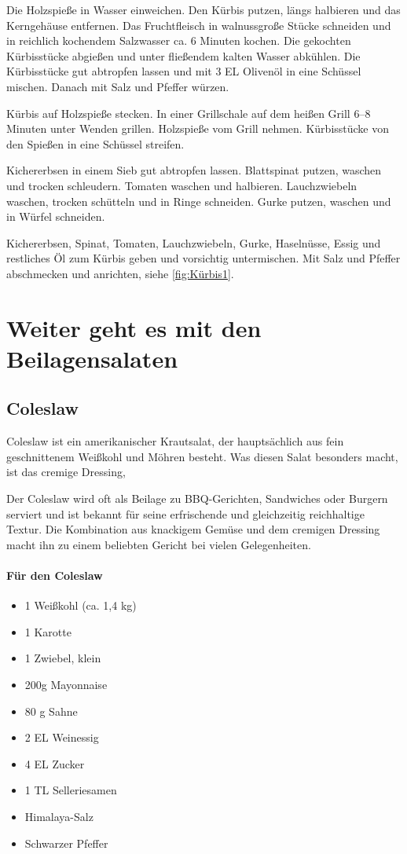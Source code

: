Die Holzspieße in Wasser einweichen. Den Kürbis putzen, längs halbieren und 
das Kerngehäuse entfernen. Das Fruchtfleisch in walnussgroße Stücke 
schneiden
und in reichlich kochendem Salzwasser ca. 6 Minuten kochen. Die gekochten 
Kürbisstücke abgießen und unter fließendem kalten Wasser abkühlen. Die 
Kürbisstücke gut abtropfen lassen und mit 3 EL Olivenöl in eine Schüssel 
mischen. Danach mit Salz und Pfeffer würzen.

Kürbis auf Holzspieße stecken. In einer Grillschale auf dem heißen Grill 6–8 
Minuten unter Wenden grillen. Holzspieße vom Grill nehmen. Kürbisstücke von 
den 
Spießen in eine Schüssel streifen.

Kichererbsen in einem Sieb gut abtropfen lassen. Blattspinat putzen, waschen 
und trocken schleudern. Tomaten waschen und halbieren. Lauchzwiebeln 
waschen,
trocken schütteln und in Ringe schneiden. Gurke putzen, waschen und in 
Würfel schneiden.

Kichererbsen, Spinat, Tomaten, Lauchzwiebeln, Gurke, Haselnüsse, Essig und 
restliches Öl zum Kürbis geben und vorsichtig untermischen. Mit Salz und 
Pfeffer
abschmecken und anrichten, siehe \vref{fig:Kürbis1}.

\section{Weiter geht es mit den Beilagensalaten}

\subsection{Coleslaw}

Coleslaw ist ein amerikanischer Krautsalat, der hauptsächlich aus fein 
geschnittenem Weißkohl und Möhren besteht. Was diesen Salat besonders 
macht, ist das cremige Dressing,

Der Coleslaw wird oft als Beilage zu BBQ-Gerichten, Sandwiches oder Burgern 
serviert und ist bekannt für seine erfrischende und gleichzeitig reichhaltige 
Textur. Die Kombination aus knackigem Gemüse und dem cremigen Dressing 
macht ihn zu einem beliebten Gericht bei vielen Gelegenheiten.

\paragraph{Für den Coleslaw}

\begin{itemize}[noitemsep]
	\item 1 Weißkohl (ca. 1,4 kg)
	\item 1 Karotte
	\item 1 Zwiebel, klein
	\item 200g Mayonnaise
	\item 80 g Sahne
	\item 2 EL Weinessig
	\item 4 EL Zucker
	\item 1 TL Selleriesamen
	\item Himalaya-Salz
	\item Schwarzer Pfeffer
\end{itemize}

